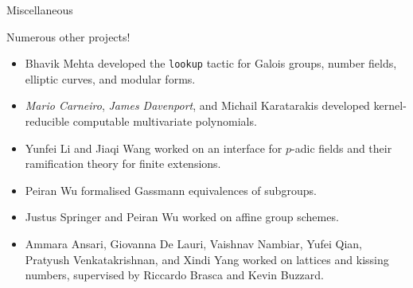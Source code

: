 \begin{frame}{Miscellaneous}

Numerous other projects!
\begin{itemize}
\item Bhavik Mehta developed the \texttt{lookup} tactic for Galois groups, number fields, elliptic curves, and modular forms.
\item \emph{Mario Carneiro}, \emph{James Davenport}, and Michail Karatarakis developed kernel-reducible computable multivariate polynomials.
\item Yunfei Li and Jiaqi Wang worked on an interface for $ p $-adic fields and their ramification theory for finite extensions.
\item Peiran Wu formalised Gassmann equivalences of subgroups.
\item Justus Springer and Peiran Wu worked on affine group schemes.
\item Ammara Ansari, Giovanna De Lauri, Vaishnav Nambiar, Yufei Qian, Pratyush Venkatakrishnan, and Xindi Yang worked on lattices and kissing numbers, supervised by Riccardo Brasca and Kevin Buzzard.
\end{itemize}

\end{frame}

